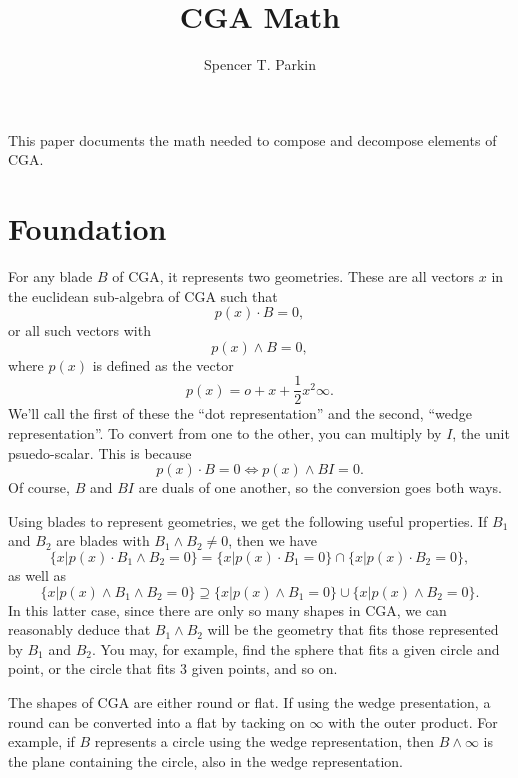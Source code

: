 \documentclass[12pt]{article}
\title{CGA Math}
\author{Spencer T. Parkin}
\newcommand{\nvao}{o}
\newcommand{\nvai}{\infty}
\begin{document}
\maketitle

This paper documents the math needed to compose and decompose elements of CGA.

\section*{Foundation}

For any blade $B$ of CGA, it represents two geometries.  These are all vectors $x$ in the euclidean sub-algebra of CGA
such that
\begin{equation*}
p(x)\cdot B = 0,
\end{equation*}
or all such vectors with
\begin{equation*}
p(x)\wedge B = 0,
\end{equation*}
where $p(x)$ is defined as the vector
\begin{equation*}
p(x) = \nvao + x + \frac{1}{2}x^2\nvai.
\end{equation*}
We'll call the first of these the ``dot representation'' and the second, ``wedge representation''.
To convert from one to the other, you can multiply by $I$, the unit psuedo-scalar.
This is because
\begin{equation*}
p(x)\cdot B = 0\iff p(x)\wedge BI=0.
\end{equation*}
Of course, $B$ and $BI$ are duals of one another, so the conversion goes both ways.

Using blades to represent geometries, we get the following useful properties.
If $B_1$ and $B_2$ are blades with $B_1\wedge B_2\neq 0$, then we have
\begin{equation*}
\{x|p(x)\cdot B_1\wedge B_2 = 0\} = \{x|p(x)\cdot B_1=0\}\cap\{x|p(x)\cdot B_2=0\},
\end{equation*}
as well as
\begin{equation*}
\{x|p(x)\wedge B_1\wedge B_2 = 0\} \supseteq \{x|p(x)\wedge B_1=0\}\cup\{x|p(x)\wedge B_2=0\}.
\end{equation*}
In this latter case, since there are only so many shapes in CGA, we can reasonably deduce that
$B_1\wedge B_2$ will be the geometry that fits those represented by $B_1$ and $B_2$.  You may,
for example, find the sphere that fits a given circle and point, or the circle that fits 3 given points,
and so on.

The shapes of CGA are either round or flat.  If using the wedge presentation, a round can be converted
into a flat by tacking on $\nvai$ with the outer product.  For example, if $B$ represents a
circle using the wedge representation, then $B\wedge\nvai$ is the plane containing the circle,
also in the wedge representation.
\end{document}
